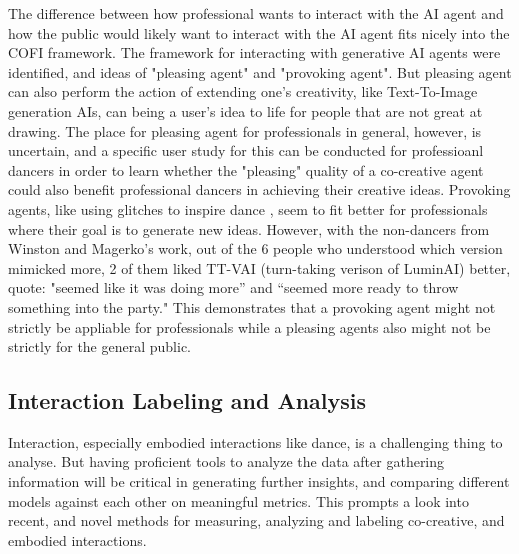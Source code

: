 \documentclass[final,5p,times,twocolumn,authoryear]{article}
\begin{document}
The difference between how professional wants to interact with the AI
agent and how the public would likely want to interact with the AI agent
fits nicely into the COFI framework. The framework for interacting with
generative AI agents were identified, and ideas of "pleasing agent" and
"provoking agent". But pleasing agent can also perform the action of
extending one's creativity, like Text-To-Image generation AIs, can being
a user's idea to life for people that are not great at drawing. The
place for pleasing agent for professionals in general, however, is
uncertain, and a specific user study for this can be conducted for
professioanl dancers in order to learn whether the "pleasing" quality of
a co-creative agent could also benefit professional dancers in achieving
their creative ideas. Provoking agents, like using glitches to inspire
dance \cite{Wallace2023}, seem to fit better for professionals where
their goal is to generate new ideas. However, with the non-dancers from
Winston and Magerko's work, out of the 6 people who understood which
version mimicked more, 2 of them liked TT-VAI (turn-taking verison
of LuminAI) better, quote: "seemed like it was doing more” and “seemed
more ready to throw something into the party." This demonstrates that
a provoking agent might not strictly be appliable for professionals
while a pleasing agents also might not be strictly for the general public.


\subsection{Interaction Labeling and Analysis}
Interaction, especially embodied interactions like dance, is a
challenging thing to analyse. But having proficient tools to analyze the
data after gathering information will be critical in generating further
insights, and comparing different models against each other on
meaningful metrics. This prompts a look into recent, and novel methods
for measuring, analyzing and labeling co-creative, and embodied interactions.


\end{document}
